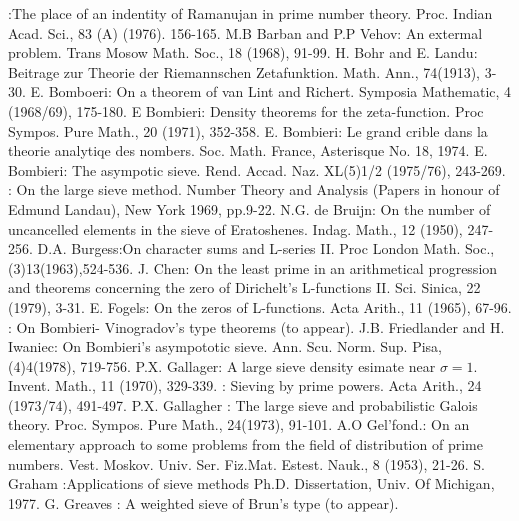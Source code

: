 \begin{thebibliography}{99}
:\pageoriginale The place of an
  indentity of Ramanujan in prime number theory. Proc. Indian
  Acad. Sci., 83 (A) (1976). 156-165. 
 {M.B Barban and P.P Vehov}: An extermal problem. Trans
  Mosow Math. Soc., 18 (1968), 91-99. 
 { H. Bohr and E. Landu}: Beitrage zur Theorie der
  Riemannschen Zetafunktion. Math. Ann., 74(1913), 3-30. 
 {E. Bomboeri}: On a theorem of van Lint and
  Richert. Symposia Mathematic, 4 (1968/69), 175-180. 
 {E Bombieri}: Density theorems for the
  zeta-function. Proc Sympos. Pure Math.,  20 (1971), 352-358.
 { E.  Bombieri}: Le grand crible dans la theorie
  analytiqe des nombers. Soc. Math. France, Asterisque No. 18, 1974. 
 { E. Bombieri}: The asympotic sieve. Rend. Accad. Naz.
  XL(5)1/2 (1975/76), 243-269.
: On the large sieve
  method. Number Theory and Analysis (Papers in honour  of Edmund
  Landau), New York 1969, pp.9-22. 
 {N.G. de Bruijn}: On the number of uncancelled elements
  in the sieve of Eratoshenes. Indag. Math., 12 (1950), 247-256. 
 { D.A. Burgess}:\pageoriginale On character sums and L-series II. Proc
  London Math. Soc., (3)13(1963),524-536. 
 {J. Chen}: On the least prime in an arithmetical
  progression and theorems concerning the zero of Dirichelt's
  L-functions II. Sci. Sinica, 22 (1979),  3-31. 
 { E. Fogels}: On the zeros of L-functions. Acta Arith.,
  11 (1965), 67-96. 
: On Bombieri- Vinogradov's
  type theorems (to appear). 
 {J.B. Friedlander and H. Iwaniec}: On Bombieri's
  asympototic sieve. Ann. Scu. Norm. Sup. Pisa, (4)4(1978), 719-756. 
 { P.X. Gallager}: A large sieve density esimate near
  $\sigma =1$. Invent. Math., 11 (1970), 329-339. 
: Sieving by prime powers. Acta Arith.,
  24 (1973/74), 491-497. 
 { P.X. Gallagher }: The large sieve and probabilistic
  Galois theory. Proc. Sympos. Pure Math.,  24(1973), 91-101. 
 { A.O Gel'fond.}: On an elementary approach to some
  problems from the field of distribution of prime
  numbers. Vest. Moskov. Univ. Ser. Fiz.Mat. Estest. Nauk., 8 (1953), 21-26.  
 { S. Graham }:\pageoriginale Applications of sieve methods
  Ph.D. Dissertation, Univ. Of Michigan, 1977. 
 {G. Greaves }: A weighted sieve of Brun's type (to appear). 

\end{thebibliography}
